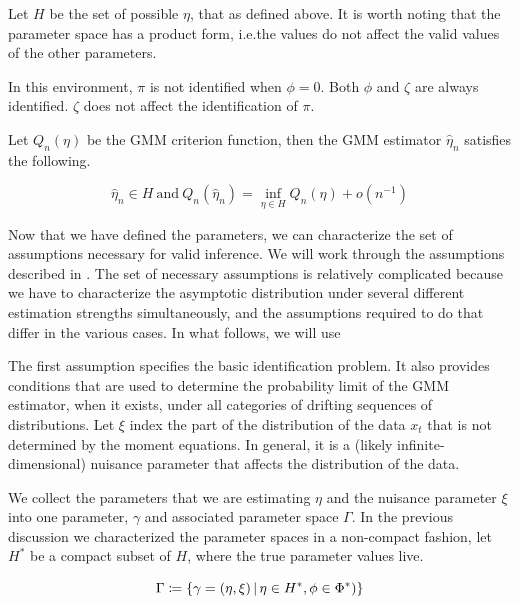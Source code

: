 \documentclass[11pt]{article}
\newcommand*{\Eta}{H}
\newcommand{\mvert}[1][\middle]{\ensuremath{\,#1\vert\,}}
\begin{document}
Let $\Eta$ be the set of possible $\eta$, that as defined above.
It is worth noting that the parameter space has a product form, i.e.\@ the values do not affect the valid values
of the other parameters.

In this environment, $\pi$ is not identified when $\phi = 0$.
Both $\phi$ and $\zeta$ are always identified.
$\zeta$ does not affect the identification of $\pi$.

Let $Q_n(\eta)$ be the GMM criterion function, then the GMM estimator $\hat{\eta}_n$ satisfies the following.


\begin{equation}
    \hat{\eta}_n \in \Eta\ \text{and}\ Q_n(\hat{\eta}_n) = \inf_{\eta \in \Eta} Q_n(\eta) +
    o\left(n^{-1}\right) 
\end{equation}


Now that we have defined the parameters, we can characterize the set of assumptions necessary for valid inference.
We will work through the assumptions described in \textcite{andrewsGmm2014}.
The set of necessary assumptions is relatively complicated because we have to characterize the asymptotic
distribution under several different estimation strengths simultaneously, and the assumptions required to do that
  differ in the various cases. 
In what follows, we will use 

The first assumption specifies the basic identification
problem. It also provides conditions that are used to determine the
probability limit of the GMM estimator, when it exists, under all categories
of drifting sequences of distributions.
Let $\xi$ index the part of the distribution of the data $x_t$ that is not determined by the moment equations.
In general, it is a (likely infinite-dimensional) nuisance parameter that affects the distribution of the data. 


We collect the parameters that we are estimating $\eta$ and the nuisance parameter $\xi$ into one parameter,
$\gamma$ and associated parameter space $\Gamma$.
In the previous discussion we characterized the parameter spaces in a non-compact fashion, let $\Eta^{*}$ be a
compact subset of $\Eta$, where the true parameter values live.

\begin{equation}
\Gamma \coloneqq \left\lbrace \gamma = (\eta, \xi) \mvert \eta \in \Eta^{*}, \phi \in \Phi^{*}) \right\rbrace 
\end{equation}
\end{document}
